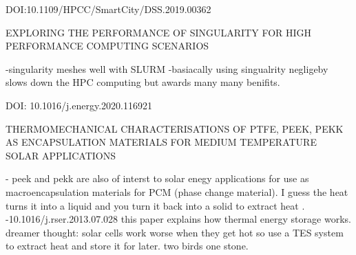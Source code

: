 DOI:10.1109/HPCC/SmartCity/DSS.2019.00362

    EXPLORING THE PERFORMANCE OF SINGULARITY FOR HIGH PERFORMANCE COMPUTING SCENARIOS

    -singularity meshes well with SLURM
    -basiacally using singualrity negligeby slows down the HPC computing but
    awards many many benifits. 

DOI: 10.1016/j.energy.2020.116921
    
    THERMOMECHANICAL CHARACTERISATIONS OF PTFE, PEEK, PEKK AS ENCAPSULATION MATERIALS FOR MEDIUM TEMPERATURE SOLAR APPLICATIONS

    - peek and pekk are also of interst to solar enegy applications for use as macroencapsulation
    materials for PCM (phase change material). I guess the heat turns it into a liquid and 
    you turn it back into a solid to extract heat . 
    -10.1016/j.rser.2013.07.028 this paper explains how thermal energy storage works. 
    dreamer thought: solar cells work worse when they get hot so use a TES system to extract heat
    and store it for later. two birds one stone. 
